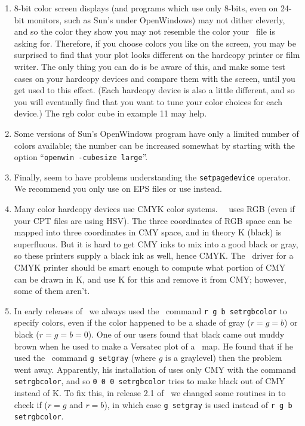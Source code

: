 \begin{enumerate}

\item 8-bit color screen displays (and programs which use only
8-bits, even on 24-bit monitors, such as Sun's  under
OpenWindows) may not dither cleverly, and so the color they show you
may not resemble the color your \PS\ file is asking
for.  Therefore, if you choose colors you like on the screen,
you may be surprised to find that your plot looks different on
the hardcopy printer or film writer.  The only thing you can
do is be aware of this, and make some test cases on your hardcopy
devices and compare them with the screen, until you get used
to this effect.  (Each hardcopy device is also a little
different, and so you will eventually find that you want to
tune your color choices for each device.)  The rgb color cube
in example 11 may help.

\item Some versions of Sun's OpenWindows program 
have only a limited number of colors available; the number
can be increased somewhat by starting  with the
option ``\texttt{openwin -cubesize large}''.

\item Finally,  seem to have problems understanding
the \texttt{setpagedevice} operator.  We recommend you only use
 on EPS files or use  instead.


\item Many color hardcopy devices use CMYK color systems. \GMT\
\PS\ uses RGB (even if your CPT files are using HSV).
The three coordinates of RGB space can be mapped into three
coordinates in CMY space, and in theory K (black) is superfluous.
But it is hard to get CMY inks to mix into a good black or gray,
so these printers supply a black ink as well, hence CMYK.  The
\PS\ driver for a CMYK printer should be smart
enough to compute what portion of CMY can be drawn in K, and
use K for this and remove it from CMY; however, some of them
aren't.

\item In early releases of \GMT\ we always used the \PS\
command \texttt{r g b setrgbcolor} to specify colors, even if the color
happened to be a shade of gray ($r=g=b$) or black ($r=g=b=0$).  One
of our users found that black came out muddy brown when he used
\progname{FreedomOfPress} to make a Versatec plot of a \GMT\ map.
He found that if he used the \PS\ command \texttt{g setgray} (where $g$
is a graylevel) then the problem went away.
Apparently, his installation of \progname{FreedomOfPress} uses only CMY with
the command \texttt{setrgbcolor}, and so \texttt{0 0 0 setrgbcolor}
tries to make black out of CMY instead of K.  To fix this, in
release 2.1 of \GMT\ we changed some routines in \filename{pslib.c}
to check if ($r=g$ and $r=b$), in which case \texttt{g setgray} is
used instead of \texttt{r g b setrgbcolor}.


\end{enumerate}
